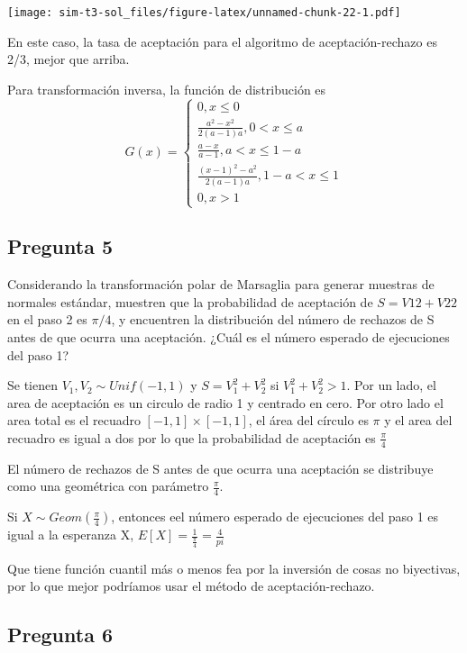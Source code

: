 \documentclass[]{article}
\begin{document}
\texttt{[image: sim-t3-sol\_files/figure-latex/unnamed-chunk-22-1.pdf]}

En este caso, la tasa de aceptación para el algoritmo de
aceptación-rechazo es 2/3, mejor que arriba.

Para transformación inversa, la función de distribución es \[
G(x) = 
\begin{cases}
0, x \leq 0 \\
\frac{a^2-x^2}{2(a-1)a}, 0 < x \leq a\\
\frac{a-x}{a-1}, a < x \leq 1-a \\
\frac{(x-1)^2-a^2}{2(a-1)a}, 1-a < x \leq 1 \\
0, x > 1
\end{cases}
\]

\hypertarget{pregunta-5}{%
\subsection{Pregunta 5}\label{pregunta-5}}

Considerando la transformación polar de Marsaglia para generar muestras
de normales estándar, muestren que la probabilidad de aceptación de
\(S = V12 + V22\) en el paso 2 es \(\pi/4\), y encuentren la
distribución del número de rechazos de S antes de que ocurra una
aceptación. ¿Cuál es el número esperado de ejecuciones del paso 1?

Se tienen \(V_1, V_2 \sim Unif(-1,1)\) y \(S=V_1^2 + V_2^2\) si
\(V_1^2 + V_2^2 > 1\). Por un lado, el area de aceptación es un circulo
de radio 1 y centrado en cero. Por otro lado el area total es el
recuadro \([-1,1] \times [-1,1]\), el área del círculo es \(\pi\) y el
area del recuadro es igual a dos por lo que la probabilidad de
aceptación es \(\frac{\pi}{4}\)

El número de rechazos de S antes de que ocurra una aceptación se
distribuye como una geométrica con parámetro \(\frac{\pi}{4}\).

Si \(X \sim Geom(\frac{\pi}{4})\), entonces eel número esperado de
ejecuciones del paso 1 es igual a la esperanza X,
\(E[X] = \frac{1}{\frac{\pi}{4}} = \frac{4}{pi}\)

Que tiene función cuantil más o menos fea por la inversión de cosas no
biyectivas, por lo que mejor podríamos usar el método de
aceptación-rechazo.

\hypertarget{pregunta-6}{%
\subsection{Pregunta 6}\label{pregunta-6}}
\end{document}
